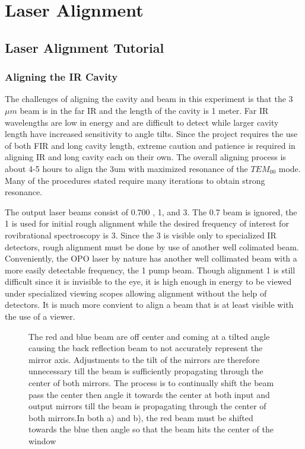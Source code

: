 \documentclass[11pt,a4paper]{book}
\newcommand{\imginput}[1]{} %
\begin{document}
\part{Laser Alignment}
\chapter{Laser Alignment Tutorial}
	\section{Aligning the IR Cavity}
		\label{sec:Aligning the IR Cavity}
		The challenges of aligning the cavity and beam in this experiment is that the 3$\mu m$ beam is in the far IR and the length of the cavity is 1 meter. Far IR wavelengths are low in energy and are difficult to detect while larger cavity length have increased sensitivity to angle tilts. Since the project requires the use of both  FIR and long cavity length, extreme caution and patience is required in aligning IR and long cavity each on their own. The overall aligning process is about 4-5 hours to align the 3um with maximized resonance of the $TEM_{00}$ mode. Many of the procedures stated require many iterations to obtain strong resonance.
		
		The output laser beams consist of 0.700 , 1, and 3. The 0.7 beam is ignored, the 1 is used for initial rough alignment while the desired frequency of interest for rovibrational spectroscopy is 3. 
		Since the 3 is visible only to specialized IR detectors, rough alignment must be done by use of another well colimated beam. Conveniently, the OPO laser by nature has another well collimated beam with a more easily detectable frequency, the 1 pump beam. Though alignment 1 is still difficult since it is invisible to the eye, it is high enough in energy to be viewed under specialized viewing scopes allowing alignment without the help of detectors. It is much more convient to align a beam that is at least visible with the use of a viewer.
		
		\begin{figure} [!ht]
			\centering
			\def\svgwidth{\columnwidth}
			\resizebox{130mm}{!}{\imginput{images/cav-align-improper.pdf_tex}}
			\caption{The red and blue beam are off center and coming at a tilted angle causing the back reflection beam to not accurately represent the mirror axis. Adjustments to the tilt of the mirrors are therefore unnecessary till the beam is sufficiently propagating through the center of both mirrors. 
				The process is to continually shift the beam pass the center then angle it towards the center at both input and output mirrors till the beam is propagating through the center of both mirrors.In both a) and b), the red beam must be shifted towards the blue then angle so that the beam hits the center of the window}
			\label{fig:cav-align-improper}
		\end{figure}
		
\end{document}
